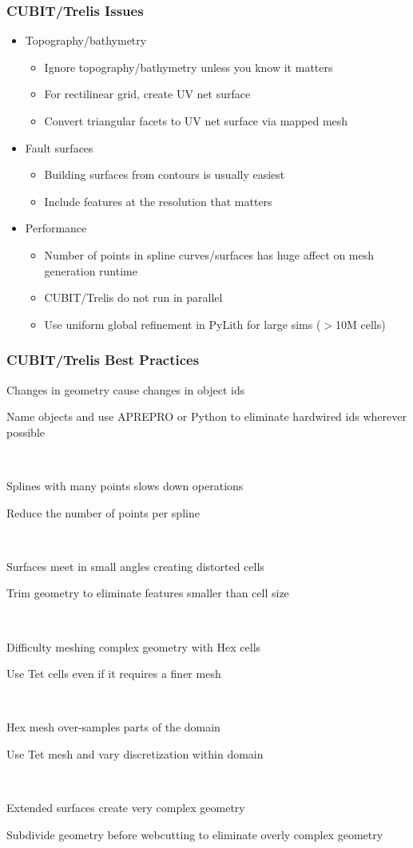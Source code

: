 \documentclass{beamer}
\newcommand{\issue}[2]{\item[Issue:] {\color{red}#1}\\{\item[Soln:] \color{blue}#2}\\[4pt]}
\begin{document}
\begin{frame}
  \frametitle{CUBIT/Trelis Issues}
 
  \begin{itemize}
  \item Topography/bathymetry
    \begin{itemize}
    \item Ignore topography/bathymetry unless you know it matters
    \item For rectilinear grid, create UV net surface
    \item Convert triangular facets to UV net surface via mapped mesh
    \end{itemize}
  \item Fault surfaces
    \begin{itemize}
    \item Building surfaces from contours is usually easiest
    \item Include features at the resolution that matters
    \end{itemize}
  \item Performance
    \begin{itemize}
    \item Number of points in spline curves/surfaces has huge affect
      on mesh generation runtime
    \item CUBIT/Trelis do not run in parallel
    \item Use uniform global refinement in PyLith for large sims ($>$10M cells) 
    \end{itemize}
  \end{itemize}

\end{frame}


\begin{frame}
  \frametitle{CUBIT/Trelis Best Practices}
  \summary{}
 
  \begin{description}
    \issue{Changes in geometry cause changes in object ids} {Name objects and use
      APREPRO or Python to eliminate hardwired ids wherever possible}
    \issue{Splines with many points slows down operations}{Reduce the
      number of points per spline}
    \issue{Surfaces meet in small angles creating distorted
      cells}{Trim geometry to eliminate features smaller than cell
      size}
    \issue{Difficulty meshing complex geometry with Hex cells}{Use
      Tet cells even if it requires a finer mesh}
    \issue{Hex mesh over-samples parts of the
      domain}{Use Tet mesh and vary discretization within domain}
    \issue{Extended surfaces create very complex geometry}{Subdivide
      geometry before webcutting to eliminate overly complex geometry}
  \end{description}

\end{frame}
\end{document}
